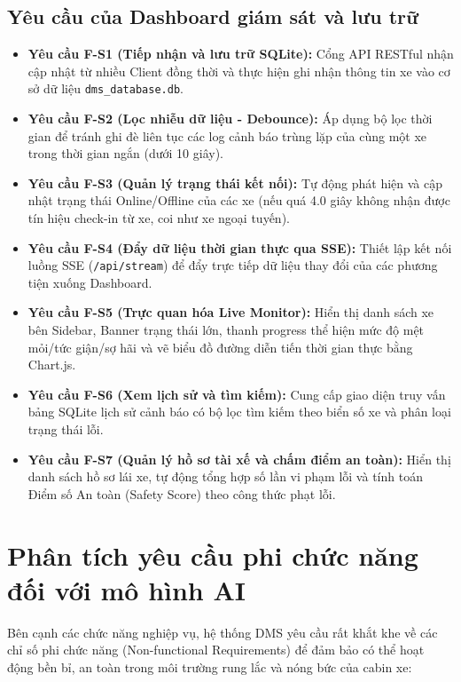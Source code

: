 \documentclass[../DoAn.tex]{subfiles}
\begin{document}
\subsection{Yêu cầu của Dashboard giám sát và lưu trữ}
\begin{itemize}
    \item \textbf{Yêu cầu F-S1 (Tiếp nhận và lưu trữ SQLite):} Cổng API RESTful nhận cập nhật từ nhiều Client đồng thời và thực hiện ghi nhận thông tin xe vào cơ sở dữ liệu \texttt{dms\_database.db}.
    \item \textbf{Yêu cầu F-S2 (Lọc nhiễu dữ liệu - Debounce):} Áp dụng bộ lọc thời gian để tránh ghi đè liên tục các log cảnh báo trùng lặp của cùng một xe trong thời gian ngắn (dưới 10 giây).
    \item \textbf{Yêu cầu F-S3 (Quản lý trạng thái kết nối):} Tự động phát hiện và cập nhật trạng thái Online/Offline của các xe (nếu quá 4.0 giây không nhận được tín hiệu check-in từ xe, coi như xe ngoại tuyến).
    \item \textbf{Yêu cầu F-S4 (Đẩy dữ liệu thời gian thực qua SSE):} Thiết lập kết nối luồng SSE (\texttt{/api/stream}) để đẩy trực tiếp dữ liệu thay đổi của các phương tiện xuống Dashboard.
    \item \textbf{Yêu cầu F-S5 (Trực quan hóa Live Monitor):} Hiển thị danh sách xe bên Sidebar, Banner trạng thái lớn, thanh progress thể hiện mức độ mệt mỏi/tức giận/sợ hãi và vẽ biểu đồ đường diễn tiến thời gian thực bằng Chart.js.
    \item \textbf{Yêu cầu F-S6 (Xem lịch sử và tìm kiếm):} Cung cấp giao diện truy vấn bảng SQLite lịch sử cảnh báo có bộ lọc tìm kiếm theo biển số xe và phân loại trạng thái lỗi.
    \item \textbf{Yêu cầu F-S7 (Quản lý hồ sơ tài xế và chấm điểm an toàn):} Hiển thị danh sách hồ sơ lái xe, tự động tổng hợp số lần vi phạm lỗi và tính toán Điểm số An toàn (Safety Score) theo công thức phạt lỗi.
\end{itemize}

\section{Phân tích yêu cầu phi chức năng đối với mô hình AI}
\label{section:2.4}
Bên cạnh các chức năng nghiệp vụ, hệ thống DMS yêu cầu rất khắt khe về các chỉ số phi chức năng (Non-functional Requirements) để đảm bảo có thể hoạt động bền bỉ, an toàn trong môi trường rung lắc và nóng bức của cabin xe:
\end{document}
